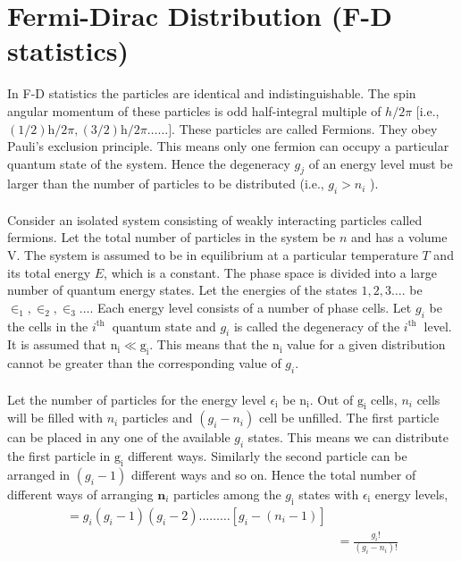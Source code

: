 \section{Fermi-Dirac Distribution (F-D statistics)}
In F-D statistics the particles are identical and indistinguishable. The spin angular momentum of these particles is odd half-integral multiple of $h / 2 \pi$ [i.e., $(1 / 2) \mathrm{h} / 2 \pi,(3 / 2) \mathrm{h} / 2 \pi \ldots \ldots]$. These particles are called Fermions. They obey Pauli's exclusion principle. This means only one fermion can occupy a particular quantum state of the system. Hence the degeneracy $g_{j}$ of an energy level must be larger than the number of particles to be distributed (i.e., $g_{i}>n_{i}$ ).\\\\
Consider an isolated system consisting of weakly interacting particles called fermions. Let the total number of particles in the system be $n$ and has a volume $\mathrm{V}$. The system is assumed to be in equilibrium at a particular temperature $T$ and its total energy $E$, which is a constant. The phase space is divided into a large number of quantum energy states. Let the energies of the states $1,2,3 \ldots .$ be $\in_{1}, \in_{2}, \in_{3} \ldots$. Each energy level consists of a number of phase cells. Let $g_{i}$ be the cells in the $i^{\text {th }}$ quantum state and $g_{i}$ is called the degeneracy of the $i^{\text {th }}$ level. It is assumed that $\mathrm{n}_{\mathrm{i}} \ll \mathrm{g}_{\mathrm{i}}$. This means that the $\mathrm{n}_{\mathrm{i}}$ value for a given distribution cannot be greater than the corresponding value of $g_{i}$.\\\\
Let the number of particles for the energy level $\epsilon_{\mathrm{i}}$ be $\mathrm{n}_{\mathrm{i}}$. Out of $\mathrm{g}_{\mathrm{i}}$ cells, $n_{i}$ cells will be filled with $n_{i}$ particles and $\left(g_{i}-n_{i}\right)$ cell be unfilled. The first particle can be placed in any one of the available $g_{i}$ states. This means we can distribute the first particle in $\mathrm{g}_{\mathrm{i}}$ different ways. Similarly the second particle can be arranged in $\left(g_{i}-1\right)$ different ways and so on. Hence the total number of different ways of arranging $\mathbf{n}_{i}$ particles among the $g_{\mathrm{i}}$ states with $\epsilon_{\mathrm{i}}$ energy levels,
\begin{align*}
=g_{i}\left(g_{i}-1\right)\left(g_{i}-2\right) \ldots \ldots \ldots\left[g_{i}-\left(n_{i}-1\right)\right]\\
&=\frac{g_{i} !}{\left(g_{i}-n_{i}\right) !}
\end{align*}
